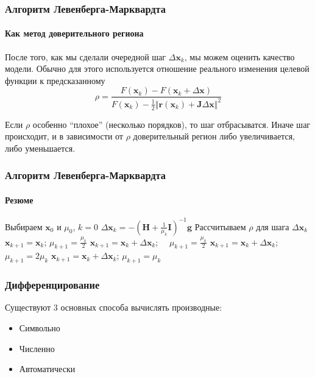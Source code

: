 \documentclass[notheorems,aspectratio=169]{beamer}
\begin{document}
\begin{frame}
  \frametitle{Алгоритм Левенберга-Марквардта}
  \framesubtitle{Как метод доверительного региона}
  После того, как мы сделали очередной шаг $\Delta\mathbf{x}_k$, мы можем оценить качество модели. Обычно для этого используется отношение реального изменения целевой функции к предсказанному
  \begin{equation*}
    \rho=\frac{F\left(\mathbf{x}_k\right)-F\left(\mathbf{x}_k+\Delta\mathbf{x}\right)}{F\left(\mathbf{x}_k\right)-\frac{1}{2}\left\Vert\mathbf{r}\left(\mathbf{x}_k\right)+\mathbf{J}\Delta\mathbf{x}\right\Vert^2}
  \end{equation*}

  Если $\rho$ особенно ``плохое'' (несколько порядков), то шаг отбрасыватся. Иначе шаг происходит, и в зависимости от $\rho$ доверительный регион либо увеличивается, либо уменьшается.
\end{frame}

\begin{frame}
  \frametitle{Алгоритм Левенберга-Марквардта}
  \framesubtitle{Резюме}

\begin{algorithm}[H]
  \SetAlgoLined
  Выбираем $\mathbf{x}_0$ и $\mu_0$, $k=0$\;
  {
    $\Delta\mathbf{x}_k=-\left(\mathbf{H}+\frac{1}{\mu_k}\mathbf{I}\right)^{-1}\mathbf{g}$\;
    Рассчитываем $\rho$ для шага $\Delta\mathbf{x}_k$\;
    {
      $\mathbf{x}_{k+1}=\mathbf{x}_k$; \quad $\mu_{k+1}=\frac{\mu_k}{2}$\;
    }
    {
      $\mathbf{x}_{k+1}=\mathbf{x}_k+\Delta\mathbf{x}_k$; $\quad \mu_{k+1}=\frac{\mu_k}{2}$\;
    }
    {
      $\mathbf{x}_{k+1}=\mathbf{x}_k+\Delta\mathbf{x}_k$; \quad $\mu_{k+1}=2\mu_k$\;
    }
    \Else
    {
      $\mathbf{x}_{k+1}=\mathbf{x}_k+\Delta\mathbf{x}_k$; \quad $\mu_{k+1}=\mu_k$\;
    }
  }
\end{algorithm}

\end{frame}

\begin{frame}
  \frametitle{Дифференцирование}
  Существуют 3 основных способа вычислять производные:
  \begin{itemize}
    \item Символьно
    \item Численно
    \item Автоматически
  \end{itemize}
\end{frame}
\end{document}
